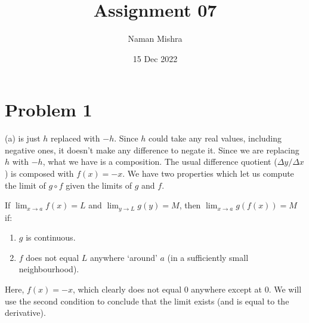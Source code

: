 \documentclass[12pt]{article}
\title{Assignment 07}
\author{Naman Mishra}
\date{15 Dec 2022}
\begin{document}
\maketitle

\section*{Problem 1}
(a) is just $h$ replaced with $-h$.
Since $h$ could take any real values, including negative ones, it doesn't make any difference to negate it.
Since we are replacing $h$ with $-h$, what we have is a composition.
The usual difference quotient ($\Delta y / \Delta x$) is composed with $f(x) = -x$.
We have two properties which let us compute the limit of $g \circ f$ given the limits of $g$ and $f$.

If $\lim_{x \to a} f(x) = L$ and $\lim_{y \to L} g(y) = M$, then $\lim_{x \to a} g(f(x)) = M$ if:
\begin{enumerate}[label=(\roman*)]
    \item $g$ is continuous.
    \item $f$ does not equal $L$ anywhere `around' $a$ (in a sufficiently small neighbourhood).
\end{enumerate}
Here, $f(x) = -x$, which clearly does not equal 0 anywhere except at 0. We will use the second condition to conclude that the limit exists (and is equal to the derivative).
\end{document}
